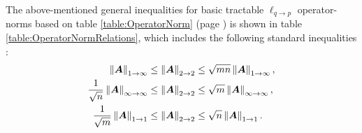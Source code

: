 \begin{remark}
\label{rmrk:operator-norm inequalities} 
The above-mentioned general inequalities for basic tractable $\ell_{q \to p}$ operator-norms based on table \ref{table:OperatorNorm} (page \pageref{table:OperatorNorm}) is shown in table \ref{table:OperatorNormRelations}, which includes the following standard inequalities \cite{Golub2013}:
\begin{gather*}
\begin{aligned}
\left\lVert\boldsymbol{A}\right\rVert_{1 \to \infty} &\leq \left\lVert\boldsymbol{A}\right\rVert_{2 \to 2} \leq \sqrt{mn} \left\lVert\boldsymbol{A}\right\rVert_{1 \to \infty}, \\
\frac{1}{\sqrt{n}}\left\lVert\boldsymbol{A}\right\rVert_{\infty \to \infty} &\leq \left\lVert\boldsymbol{A}\right\rVert_{2 \to 2} \leq \sqrt{m} \left\lVert\boldsymbol{A}\right\rVert_{\infty \to \infty}, \\
\frac{1}{\sqrt{m}}\left\lVert\boldsymbol{A}\right\rVert_{1 \to 1} &\leq \left\lVert\boldsymbol{A}\right\rVert_{2 \to 2} \leq \sqrt{n} \left\lVert\boldsymbol{A}\right\rVert_{1 \to 1}.
\end{aligned}
\end{gather*}
\end{remark}
